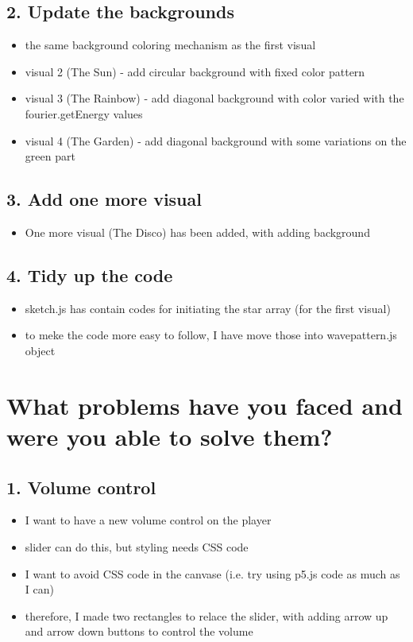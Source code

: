 \subsection*{2. Update the backgrounds}

\begin{itemize}
  \item the same background coloring mechanism as the first visual
  \item visual 2 (The Sun) - add circular background with fixed color pattern
  \item visual 3 (The Rainbow) - add diagonal background with color varied with the fourier.getEnergy values
  \item visual 4 (The Garden) - add diagonal background with some variations on the green part
\end{itemize}

\subsection*{3. Add one more visual}

\begin{itemize}
  \item One more visual (The Disco) has been added, with adding background
\end{itemize}

\subsection*{4. Tidy up the code}

\begin{itemize}
  \item sketch.js has contain codes for initiating the star array (for the first visual)
  \item to meke the code more easy to follow, I have move those into wavepattern.js object
\end{itemize}

\section*{What problems have you faced and were you able to solve them?}

\subsection*{1. Volume control}

\begin{itemize}
  \item I want to have a new volume control on the player
  \item slider can do this, but styling needs CSS code
  \item I want to avoid CSS code in the canvase (i.e. try using p5.js code as much as I can)
  \item therefore, I made two rectangles to relace the slider, with adding arrow up and arrow down buttons to control the volume
\end{itemize}

